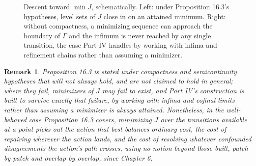 \documentclass[11pt]{book}
\newtheorem{remark}[theorem]{Remark}
\begin{document}
\begin{figure}[htb]
\centering
{}
\caption{Descent toward $\min J$, schematically. Left: under Proposition 16.3's hypotheses, level sets of $J$ close in on an attained minimum. Right: without compactness, a minimizing sequence can approach the boundary of $\Gamma$ and the infimum is never reached by any single transition, the case Part IV handles by working with infima and refinement chains rather than assuming a minimizer.}
\label{fig:contour-descent}
\end{figure}

\begin{remark}
Proposition 16.3 is stated under compactness and semicontinuity hypotheses that will not always hold, and are not claimed to hold in general; where they fail, minimizers of $J$ may fail to exist, and Part IV's construction is built to survive exactly that failure, by working with infima and cofinal limits rather than assuming a minimizer is always attained. Nonetheless, in the well-behaved case Proposition 16.3 covers, minimizing $J$ over the transitions available at a point picks out the action that best balances ordinary cost, the cost of repairing wherever the action lands, and the cost of resolving whatever confounded disagreements the action's path crosses, using no notion beyond those built, patch by patch and overlap by overlap, since Chapter 6.
\end{remark}
\end{document}
